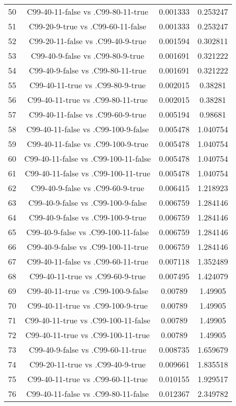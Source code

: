 \documentclass[a4paper,10pt]{article}
\begin{document}
\begin{landscape}
\begin{table}[!htp]
\begin{tabular}{cccc}
50&C99-40-11-false vs .C99-80-11-true&0.001333&0.253247\\
51&C99-20-9-true vs .C99-60-11-false&0.001333&0.253247\\
52&C99-20-11-false vs .C99-40-9-true&0.001594&0.302811\\
53&C99-40-9-false vs .C99-80-9-true&0.001691&0.321222\\
54&C99-40-9-false vs .C99-80-11-true&0.001691&0.321222\\
55&C99-40-11-true vs .C99-80-9-true&0.002015&0.38281\\
56&C99-40-11-true vs .C99-80-11-true&0.002015&0.38281\\
57&C99-40-11-false vs .C99-60-9-true&0.005194&0.98681\\
58&C99-40-11-false vs .C99-100-9-false&0.005478&1.040754\\
59&C99-40-11-false vs .C99-100-9-true&0.005478&1.040754\\
60&C99-40-11-false vs .C99-100-11-false&0.005478&1.040754\\
61&C99-40-11-false vs .C99-100-11-true&0.005478&1.040754\\
62&C99-40-9-false vs .C99-60-9-true&0.006415&1.218923\\
63&C99-40-9-false vs .C99-100-9-false&0.006759&1.284146\\
64&C99-40-9-false vs .C99-100-9-true&0.006759&1.284146\\
65&C99-40-9-false vs .C99-100-11-false&0.006759&1.284146\\
66&C99-40-9-false vs .C99-100-11-true&0.006759&1.284146\\
67&C99-40-11-false vs .C99-60-11-true&0.007118&1.352489\\
68&C99-40-11-true vs .C99-60-9-true&0.007495&1.424079\\
69&C99-40-11-true vs .C99-100-9-false&0.00789&1.49905\\
70&C99-40-11-true vs .C99-100-9-true&0.00789&1.49905\\
71&C99-40-11-true vs .C99-100-11-false&0.00789&1.49905\\
72&C99-40-11-true vs .C99-100-11-true&0.00789&1.49905\\
73&C99-40-9-false vs .C99-60-11-true&0.008735&1.659679\\
74&C99-20-11-true vs .C99-40-9-true&0.009661&1.835518\\
75&C99-40-11-true vs .C99-60-11-true&0.010155&1.929517\\
76&C99-40-11-false vs .C99-80-11-false&0.012367&2.349782\\

\end{tabular}
\end{table}
\end{landscape}
\end{document}
